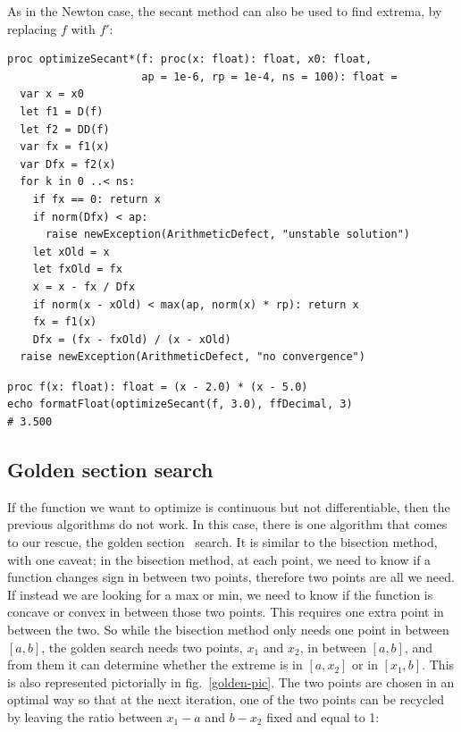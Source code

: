 \documentclass[justified, sixbynine]{tufte-book}
\def\ft{\small\tt}
\theoremstyle{plain}%
\newtheorem * {corollary}{Corollary}
\theoremstyle{definition}
\theoremstyle{remark}
\newtheorem * {remark}{Remark}
\newtheorem * {note}{Note}
\begin{document}
\begin{fullwidth}

As in the Newton case, the secant method can also be used to find extrema, by replacing $f$ with $f'$:

\begin{lstlisting}[caption={in file: {\ft nlib/solvers.nim}}]
proc optimizeSecant*(f: proc(x: float): float, x0: float,
                     ap = 1e-6, rp = 1e-4, ns = 100): float =
  var x = x0
  let f1 = D(f)
  let f2 = DD(f)
  var fx = f1(x)
  var Dfx = f2(x)
  for k in 0 ..< ns:
    if fx == 0: return x
    if norm(Dfx) < ap:
      raise newException(ArithmeticDefect, "unstable solution")
    let xOld = x
    let fxOld = fx
    x = x - fx / Dfx
    if norm(x - xOld) < max(ap, norm(x) * rp): return x
    fx = f1(x)
    Dfx = (fx - fxOld) / (x - xOld)
  raise newException(ArithmeticDefect, "no convergence")
\end{lstlisting}

\begin{lstlisting}
proc f(x: float): float = (x - 2.0) * (x - 5.0)
echo formatFloat(optimizeSecant(f, 3.0), ffDecimal, 3)
# 3.500
\end{lstlisting}

\goodbreak\subsection{Golden section search}


If the function we want to optimize is continuous but not differentiable, then the previous algorithms do not work. In this case, there is one algorithm that comes to our rescue, the golden section~\cite{golden} search. It is similar to the bisection method, with one caveat; in the bisection method, at each point, we need to know if a function changes sign in between two points, therefore two points are all we need. If instead we are looking for a max or min, we need to know if the function is concave or convex in between those two points. This requires one extra point in between the two. So while the bisection method only needs one point in between $[a, b]$, the golden search needs two points, $x_1$ and $x_2$, in between $[a, b]$, and from them it can determine whether the extreme is in $[a, x_2]$ or in $[x_1, b]$. This is also represented pictorially in fig.~\ref{golden-pic}. The two points are chosen in an optimal way so that at the next iteration, one of the two points can be recycled by leaving the ratio between $x_1-a$ and $b-x_2$ fixed and equal to 1:


\end{fullwidth}
\end{document}
